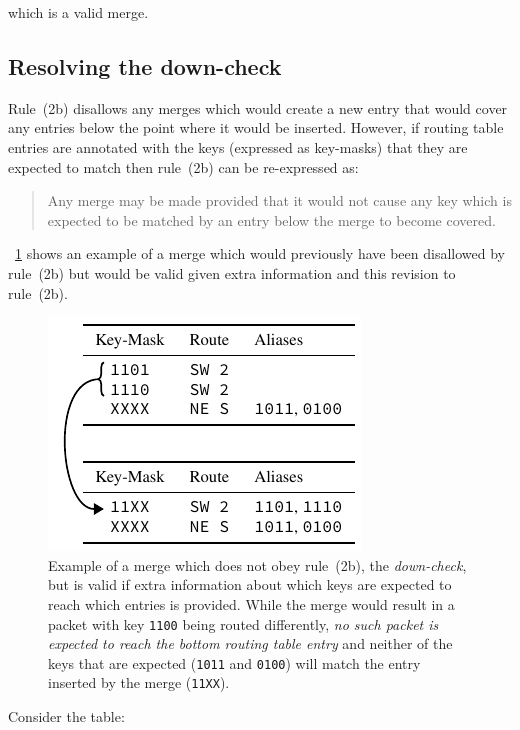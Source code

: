 \documentclass[conference]{IEEEtran}
\newcommand{\mytt}[1]{\texttt{\footnotesize#1}}
\begin{document}
  \noindent which is a valid merge.

  \subsection{Resolving the down-check}
  
  Rule~(2b) disallows any merges which would create a new entry that would cover any entries below the point where it would be inserted.
  However, if routing table entries are annotated with the keys (expressed as key-masks) that they are expected to match then rule~(2b) can be re-expressed as:

  \begin{quote}
    Any merge may be made provided that it would not cause any key which is expected to be matched by an entry below the merge to become covered.
  \end{quote}

  \figurename~\ref{fig:algorithm/rule2b'_example} shows an example of a merge which would previously have been disallowed by rule~(2b) but would be valid given extra information and this revision to rule~(2b).

  \begin{figure}[!b]
    \centering
    \includegraphics{figures/aliases_example}
    \caption{
      Example of a merge which does not obey rule~(2b), the \textit{down-check}, but is valid if extra information about which keys are expected to reach which entries is provided.
      While the merge would result in a packet with key \mytt{1100} being routed differently, \textit{no such packet is expected to reach the bottom routing table entry} and neither of the keys that are expected (\mytt{1011} and \mytt{0100}) will match the entry inserted by the merge (\mytt{11XX}).
    }
    \label{fig:algorithm/rule2b'_example}
  \end{figure}

  Consider the table:
\end{document}
